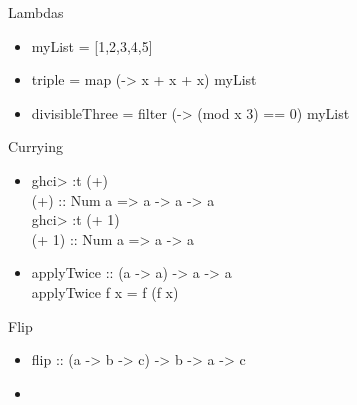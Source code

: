 \documentclass{beamer}                  %
\newcommand{\srule}{
	\rule{\textwidth}{1pt}\\
}
\newlength{\subsecwidth}
\newenvironment{slide}{
	\begin{frame} %
	\settowidth{\subsecwidth}{\insertsubsection} %
	\ifthenelse{\dimtest{\subsecwidth}{<}{1pt}}{ %
		\frametitle{\insertsection\\             %
		\vspace{-1ex}                            %
		\color{fore}\srule                       %
		\par                                     %
		\vspace{-3ex}                            %
		}
	}{                                           %
		\frametitle{\insertsection\ -- \insertsubsection\\ %
		\vspace{-1ex}                            %
		\color{fore}\srule                       %
		\par                                     %
		\vspace{-3ex}                            %
		}
	}
	\Large                                       %
}{
	\end{frame}
}
\begin{document}
\begin{slide}
  Lambdas
  \begin{itemize}
    \item myList = [1,2,3,4,5]
    \item triple = map (\x -> x + x + x) myList
    \item divisibleThree = filter (\x -> (mod x 3) == 0) myList
  \end{itemize}
\end{slide}

\begin{slide}
  Currying
  \begin{itemize}
    \item
      ghci> :t (+)\\
      (+) :: Num a => a -> a -> a\\
      ghci> :t (+ 1)\\
      (+ 1) :: Num a => a -> a\\
    \item
      applyTwice :: (a -> a) -> a -> a\\
      applyTwice f x = f (f x)
  \end{itemize}
\end{slide}

\begin{slide}
  Flip
  \begin{itemize}
    \item flip :: (a -> b -> c) -> b -> a -> c
    \item
  \end{itemize}
\end{slide}



\end{document}
